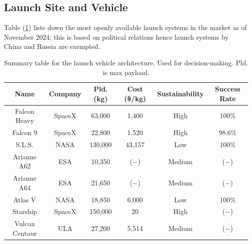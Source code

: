 \subsection{Launch Site and Vehicle}
Table (\ref{LaunchVehicle}) lists down the most openly available launch systems in the market as of November 2024; this is based on political relations hence launch systems by China and Russia are exempted. 
\begin{table}[h]
\centering
\begin{tabular}{|c|c|c|c|c|c|}
\hline
\textbf{Name} & \textbf{Company} & \textbf{Pld.(kg)} & \textbf{Cost (\$/kg)} & \textbf{Sustainability} & \textbf{Success Rate} \\ \hline
Falcon Heavy & SpaceX & 63,000 & 1,400 & High& 100\% \\ \hline
Falcon 9 & SpaceX & 22,800 & 1,520 & High& 98.6\% \\ \hline
S.L.S. & NASA & 130,000 & 43,157 &Low & 100\% \\ \hline
Arianne A62 & ESA & 10,350 & ($-$) & Medium& ($-$)\\ \hline
Arianne A64 & ESA & 21,650 & ($-$) & Medium& ($-$)\\ \hline
Atlas V& NASA & 18,850 & 6,000 & Low& 100\% \\ \hline
Starship & SpaceX & 150,000 & 20 & High& ($-$) \\ \hline
Vulcan Centaur & ULA & 27,200 &5,514 & Medium&($-$) \\ \hline
\end{tabular}
\caption{Summary table for the launch vehicle architecture. Used for decision-making. Pld. is max payload. }
\label{LaunchVehicle}
\end{table}

